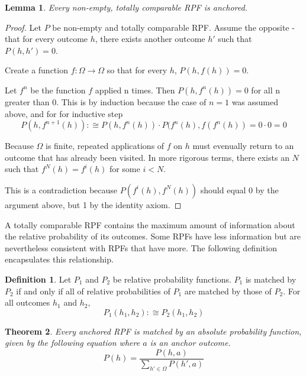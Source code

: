 \documentclass[twoside]{article}
\theoremstyle{plain}%
\newtheorem{theorem}{Theorem}[section]
\newtheorem{lemma}[theorem]{Lemma}
\theoremstyle{definition}
\newtheorem{definition}{Definition}[section]
\theoremstyle{remark}
\begin{document}
\begin{lemma}
\label{lemma:totally_comp_anchored}
Every non-empty, totally comparable RPF is anchored.
\end{lemma}

\begin{proof}
Let \(P\) be non-empty and totally comparable RPF. Assume the opposite - that for every outcome \(h\), there exists another outcome \(h'\) such that \(P(h, h') = 0\).

Create a function \(f: \Omega \rightarrow \Omega\) so that for every \(h\), \(P(h, f(h)) = 0\).

Let \(f^n\) be the function \(f\) applied n times. Then \(P(h, f^n(h)) = 0\) for all n greater than 0. This is by induction because the case of \(n = 1\) was assumed above, and for for inductive step
\[P(h, f^{n+1}(h)) :\cong P(h, f^n(h)) \cdot P(f^n(h), f(f^n(h)) = 0 \cdot 0 = 0\]

Because \(\Omega\) is finite, repeated applications of \(f\) on \(h\) must evenually return to an outcome that has already been visited. In more rigorous terms, there exists an \(N\) such that \(f^N(h) = f^i(h)\) for some \(i < N\).

This is a contradiction because \(P(f^i(h), f^N(h))\) should equal 0 by the argument above, but 1 by the identity axiom.
\end{proof}

A totally comparable RPF contains the maximum amount of information about the relative probability of its outcomes. Some RPFs have less information but are nevertheless consistent with RPFs that have more. The following definition encapsulates this relationship.

\begin{definition}
Let \(P_1\) and \(P_2\) be relative probability functions. \(P_1\) is matched by \(P_2\) if and only if all of relative probabilities of \(P_1\) are matched by those of \(P_2\). For all outcomes \(h_1\) and \(h_2\),
\[P_1(h_1, h_2) :\cong P_2(h_1, h_2)\]
\end{definition}

\begin{theorem}
\label{thm:absolute_prob_formula}
Every anchored RPF is matched by an absolute probability function, given by the following equation where \(a\) is an anchor outcome.
\[P(h) = \frac{P(h, a)}{\sum_{h' \in \Omega}P(h', a)}\]
\end{theorem}
\end{document}
